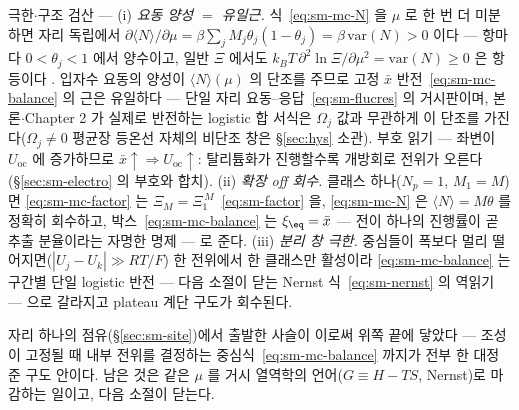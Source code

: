 \begin{verifybox}
극한$\cdot$구조 검산 --- (i) \emph{요동 양성 $=$ 유일근.} 식~\eqref{eq:sm-mc-N} 을 $\mu$ 로 한 번 더
미분하면 자리 독립에서 $\partial\langle N\rangle/\partial\mu=\beta\sum_jM_j\theta_j(1-\theta_j)
=\beta\,\mathrm{var}(N)>0$ 이다 --- 항마다 $0<\theta_j<1$ 에서 양수이고, 일반 $\Xi$ 에서도
$k_BT\,\partial^2\ln\Xi/\partial\mu^2=\mathrm{var}(N)\ge0$ 은 항등이다 \cite{mcquarrie1976}. 입자수 요동의
양성이 $\langle N\rangle(\mu)$ 의 단조를 주므로 고정 $\bar x$ 반전~\eqref{eq:sm-mc-balance} 의 근은 유일하다
--- 단일 자리 요동--응답~\eqref{eq:sm-flucres} 의 거시판이며, 본론$\cdot$Chapter 2 가 실제로 반전하는
logistic 합 서식은 $\Omega_j$ 값과 무관하게 이 단조를 가진다($\Omega_j\ne0$ 평균장 등온선 자체의 비단조
창은 \S\ref{sec:hys} 소관). 부호 읽기 --- 좌변이 $U_\mathrm{oc}$ 에 증가하므로
$\bar x\!\uparrow\Rightarrow U_\mathrm{oc}\!\uparrow$: 탈리튬화가 진행할수록 개방회로 전위가
오른다(\S\ref{sec:sm-electro} 의 부호와 합치). (ii) \emph{확장 off 회수.} 클래스 하나($N_p=1$, $M_1=M$)면
\eqref{eq:sm-mc-factor} 는 $\Xi_M=\Xi_1^{\,M}$~\eqref{eq:sm-factor} 을, \eqref{eq:sm-mc-N} 은
$\langle N\rangle=M\theta$ 를 정확히 회수하고, 박스~\eqref{eq:sm-mc-balance} 는 $\xi_\eq=\bar x$ --- 전이
하나의 진행률이 곧 추출 분율이라는 자명한 명제 --- 로 준다. (iii) \emph{분리 창 극한.} 중심들이 폭보다
멀리 떨어지면($|U_j-U_k|\gg RT/F$) 한 전위에서 한 클래스만 활성이라 \eqref{eq:sm-mc-balance} 는 구간별
단일 logistic 반전 --- 다음 소절이 닫는 Nernst 식~\eqref{eq:sm-nernst} 의 역읽기 --- 으로 갈라지고
plateau 계단 구도가 회수된다.
\end{verifybox}

자리 하나의 점유(\S\ref{sec:sm-site})에서 출발한 사슬이 이로써 위쪽 끝에 닿았다 --- 조성이 고정될 때 내부
전위를 결정하는 중심식~\eqref{eq:sm-mc-balance} 까지가 전부 한 대정준 구도 안이다. 남은 것은 같은 $\mu$
를 거시 열역학의 언어($G\equiv H-TS$, Nernst)로 마감하는 일이고, 다음 소절이 닫는다.




